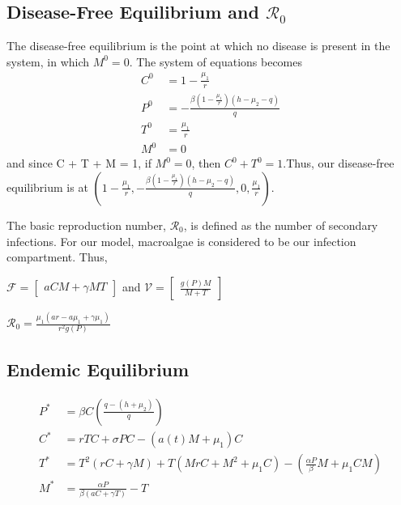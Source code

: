 \documentclass[12pt]{article}
\begin{document}
\subsection{Disease-Free Equilibrium and $\mathscr{R}_{0}$}
The disease-free equilibrium is the point at which no disease is present in the system, in which $M^{0} = 0$. The system of equations becomes
\begin{align*}
        C^{0} &= 1 - \frac{\mu_{1}}{r}\\
        P^{0} &= -\frac{\beta(1 - \frac{\mu_{1}}{r})(h - \mu_{2} - q)}{q}\\
        T^{0} &= \frac{\mu_{1}}{r}\\
        M^{0} &= 0 
\end{align*}
and since C + T + M = 1, if $M^{0} = 0$, then $C^{0} + T^{0} = 1$.Thus, our disease-free equilibrium is at $(1 - \frac{\mu_{1}}{r}, -\frac{\beta(1 - \frac{\mu_{1}}{r})(h - \mu_{2} - q)}{q}, 0, \frac{\mu_{1}}{r})$.

The basic reproduction number, $\mathscr{R}_{0}$, is defined as the number of secondary infections. For our model, macroalgae is considered to be our infection compartment. Thus, 

\begin{center}

$\mathscr{F} = 
\begin{bmatrix} aCM + \gamma MT \end{bmatrix}$ and $\mathscr{V} = \begin{bmatrix} \frac{g(P)M}{M+T} \end{bmatrix}$

$\displaystyle {\mathscr{R}}_{0} = \frac{\mu_{1}(a r - a\mu_{1} + \gamma \mu_{1})}{r^{2}g(P)}$

\end{center}

\subsection{Endemic Equilibrium}
\begin{align*}
        P^{*} &= \beta C \left(\frac{q-(h+\mu_{2})}{q}\right)\\
        C^{*} &= rTC + \sigma PC - (a(t)M+\mu_{1})C\\
        T^{*} &= T^{2}(rC+\gamma M) + T(MrC + M^{2} + \mu_{1}C) - \left(\frac{\alpha P}{\beta}M + \mu_{1} CM\right)\\
        M^{*} &= \frac{\alpha P}{\beta (aC + \gamma T)} - T\\
\end{align*}
\end{document}
